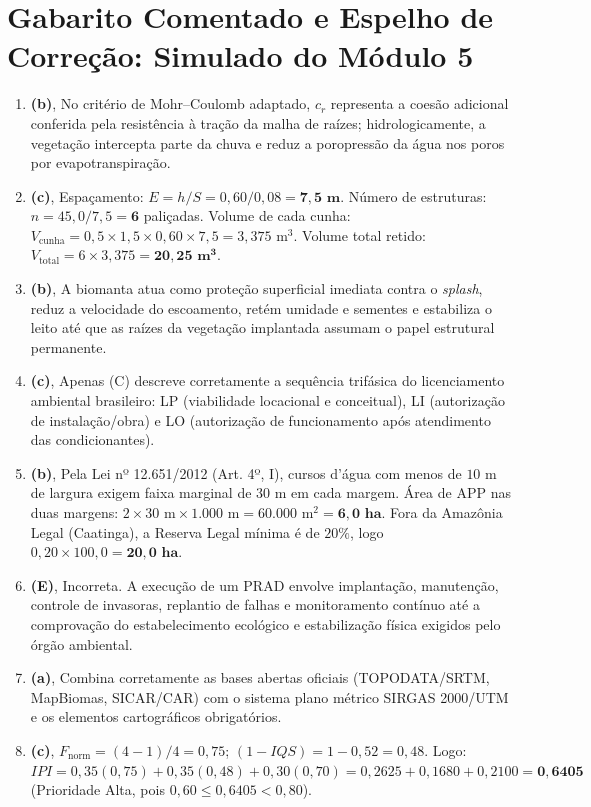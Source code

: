 \clearpage
\section*{Gabarito Comentado e Espelho de Correção: Simulado do Módulo 5}

\begin{boxGabarito}
\begin{enumerate}[leftmargin=1.6em, itemsep=4pt]
  \item \textbf{(b)}, No critério de Mohr--Coulomb adaptado, $c_r$ representa a coesão adicional conferida pela resistência à tração da malha de raízes; hidrologicamente, a vegetação intercepta parte da chuva e reduz a poropressão da água nos poros por evapotranspiração.
  \item \textbf{(c)}, Espaçamento: $E = h / S = 0{,}60 / 0{,}08 = \mathbf{7{,}5\text{ m}}$. Número de estruturas: $n = 45{,}0 / 7{,}5 = \mathbf{6}$ paliçadas. Volume de cada cunha: $V_{\text{cunha}} = 0{,}5 \times 1{,}5 \times 0{,}60 \times 7{,}5 = 3{,}375\text{ m}^3$. Volume total retido: $V_{\text{total}} = 6 \times 3{,}375 = \mathbf{20{,}25\text{ m}^3}$.
  \item \textbf{(b)}, A biomanta atua como proteção superficial imediata contra o \textit{splash}, reduz a velocidade do escoamento, retém umidade e sementes e estabiliza o leito até que as raízes da vegetação implantada assumam o papel estrutural permanente.
  \item \textbf{(c)}, Apenas (C) descreve corretamente a sequência trifásica do licenciamento ambiental brasileiro: LP (viabilidade locacional e conceitual), LI (autorização de instalação/obra) e LO (autorização de funcionamento após atendimento das condicionantes).
  \item \textbf{(b)}, Pela Lei nº 12.651/2012 (Art. 4º, I), cursos d'água com menos de $10\text{ m}$ de largura exigem faixa marginal de \textbf{$30\text{ m}$} em cada margem. Área de APP nas duas margens: $2 \times 30\text{ m} \times 1.000\text{ m} = 60.000\text{ m}^2 = \mathbf{6{,}0\text{ ha}}$. Fora da Amazônia Legal (Caatinga), a Reserva Legal mínima é de $20\%$, logo $0{,}20 \times 100{,}0 = \mathbf{20{,}0\text{ ha}}$.
  \item \textbf{(E)}, Incorreta. A execução de um PRAD envolve implantação, manutenção, controle de invasoras, replantio de falhas e monitoramento contínuo até a comprovação do estabelecimento ecológico e estabilização física exigidos pelo órgão ambiental.
  \item \textbf{(a)}, Combina corretamente as bases abertas oficiais (TOPODATA/SRTM, MapBiomas, SICAR/CAR) com o sistema plano métrico SIRGAS 2000/UTM e os elementos cartográficos obrigatórios.
  \item \textbf{(c)}, $F_{\text{norm}} = (4 - 1)/4 = 0{,}75$; $(1 - IQS) = 1 - 0{,}52 = 0{,}48$. Logo: $IPI = 0{,}35(0{,}75) + 0{,}35(0{,}48) + 0{,}30(0{,}70) = 0{,}2625 + 0{,}1680 + 0{,}2100 = \mathbf{0{,}6405}$ (Prioridade Alta, pois $0{,}60 \le 0{,}6405 < 0{,}80$).
\end{enumerate}
\end{boxGabarito}


